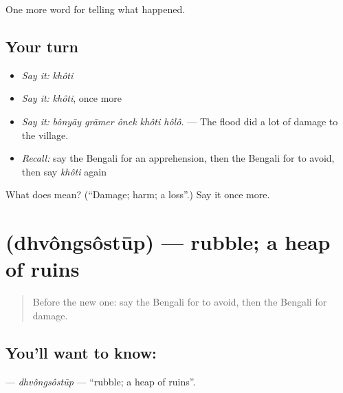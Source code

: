 \begin{grammarlens}[title={What you've built}]
One more word for telling what happened.
\end{grammarlens}

\subsection*{Your turn}
\begin{itemize}
\raggedright
  \item \emph{Say it:} \emph{khôti}
  \item \emph{Say it:} \emph{khôti}, once more
  \item \emph{Say it:} \emph{bônyāy grāmer ônek khôti hôlô.} — The flood did a lot of damage to the village.
  \item \emph{Recall:} say the Bengali for an apprehension, then the Bengali for to avoid, then say \emph{khôti} again
\end{itemize}

\begin{tcolorbox}[breakable,colback=teal!4,colframe=teal!35!black,title={Before you move on}]
What does  mean? (\textquotedblleft{}Damage; harm; a loss\textquotedblright{}.) Say it once more.
\end{tcolorbox}
\section[\texorpdfstring{\bn{ধ্বংসস্তূপ} (dhvôngsôstūp)}{ধ্বংসস্তূপ (dhvôngsôstūp)}]{ (dhvôngsôstūp) — rubble; a heap of ruins}

\label{lesson:BN-C295-dhvongsostup}



\begin{quote}
Before the new one: say the Bengali for to avoid, then the Bengali for damage.
\end{quote}

\subsection*{You'll want to know: }
\textbf{} — \emph{dhvôngsôstūp} — \textquotedblleft{}rubble; a heap of ruins\textquotedblright{}.

\begin{quote}
    
\end{quote}

